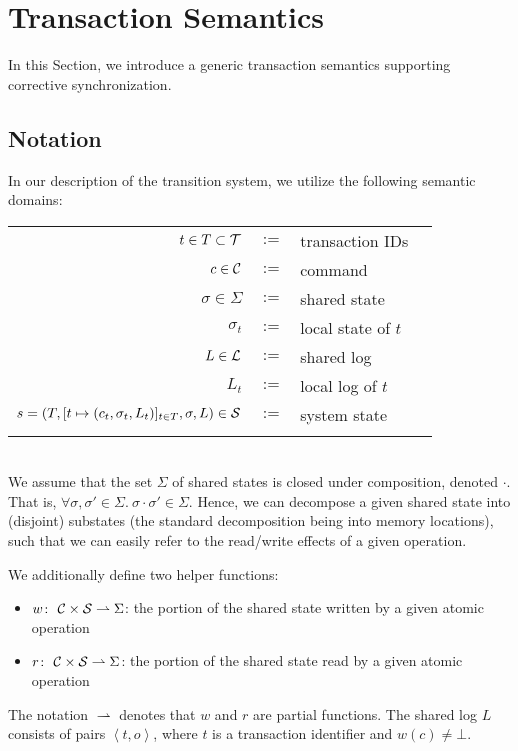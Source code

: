 \section{Transaction Semantics}
\label{sec:concretesemantics}

In this Section, we introduce a generic transaction semantics supporting corrective synchronization.

\subsection{Notation}
\label{sec:concretedomain}

In our description of the transition system, we utilize the following semantic domains:
\\
\begin{tabular}{rcll}
	\\
	$t \in T \subset {\cal T}$ & $:=$ & transaction IDs \\
	$c \in {\cal C}$ & $:=$ & command \\
	$\sigma \in \Sigma$ & $:=$ & shared state \\
	${\sigma_t}$ & $:=$ & local state of $t$ \\
	$L \in {\cal L}$ & $:=$ & shared log \\
	$L_t$ & $:=$ & local log of $t$ \\
	$s = (T, [t \mapsto (c_t,\sigma_t,L_t)]_{t \in T}, \sigma, L) \in {\cal S}$ & $:=$ & system state \\
	\\
\end{tabular}
\\
We assume that the set $\Sigma$ of shared states is closed under composition, denoted $\cdot$. That is,
$\forall \sigma,\sigma' \in \Sigma.\ \sigma \cdot \sigma' \in \Sigma$. Hence, we can decompose a given shared state into (disjoint) substates (the standard decomposition being into memory locations), such that we can easily refer to the read/write effects of a given operation.

We additionally define two helper functions:
\begin{itemize}
\item $w \colon\ {\cal C} \times {\cal S} \rightharpoonup \Sigma$: the portion of the shared state written by a given atomic operation
\item $r \colon\ {\cal C} \times {\cal S} \rightharpoonup \Sigma$: the portion of the shared state read by a given atomic operation
\end{itemize}
The notation $\rightharpoonup$ denotes that $w$ and $r$ are partial functions. The shared log $L$ consists of pairs $\left\langle t,o \right\rangle$, where $t$ is a transaction identifier and $w(c) \neq \bot$.


